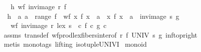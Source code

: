\begin{isabellebody}
\ \ \ h{}{\isacharcolon}{\kern0pt}\ {\isachardoublequoteopen}wf\ {\isacharparenleft}{\kern0pt}inv{\isacharunderscore}{\kern0pt}image\ r\ f{\isacharparenright}{\kern0pt}{\isachardoublequoteclose}\ \isanewline
\ \ h{}{\isacharcolon}{\kern0pt}\ {\isachardoublequoteopen}{\isasymAnd}\ a{\isachardot}{\kern0pt}\ a\ {\isasymin}\ range\ f\ {\isasymLongrightarrow}\ wf\ {\isacharparenleft}{\kern0pt}{\isacharbraceleft}{\kern0pt}x{\isachardot}{\kern0pt}\ f\ x\ {\isacharequal}{\kern0pt}\ a{\isacharbraceright}{\kern0pt}\ {\isasymtimes}\ {\isacharbraceleft}{\kern0pt}x{\isachardot}{\kern0pt}\ f\ x\ {\isacharequal}{\kern0pt}\ a{\isacharbraceright}{\kern0pt}\ {\isasyminter}\ {\isacharparenleft}{\kern0pt}inv{\isacharunderscore}{\kern0pt}image\ s\ g{\isacharparenright}{\kern0pt}{\isacharparenright}{\kern0pt}{\isachardoublequoteclose}\isanewline
\ \ \ {\isachardoublequoteopen}wf\ {\isacharparenleft}{\kern0pt}inv{\isacharunderscore}{\kern0pt}image\ {\isacharparenleft}{\kern0pt}r\ {\isacharless}{\kern0pt}{\isacharasterisk}{\kern0pt}lex{\isacharasterisk}{\kern0pt}{\isachargreater}{\kern0pt}\ s{\isacharparenright}{\kern0pt}\ {\isacharparenleft}{\kern0pt}{\isasymlambda}\ c{\isachardot}{\kern0pt}\ {\isacharparenleft}{\kern0pt}f\ c{\isacharcomma}{\kern0pt}\ g\ c{\isacharparenright}{\kern0pt}{\isacharparenright}{\kern0pt}{\isacharparenright}{\kern0pt}{\isachardoublequoteclose}\isanewline
%
\isadelimproof
\ \ %
\endisadelimproof
%
\isatagproof
{}\isamarkupfalse%
\ assms\ trans{\isacharunderscore}{\kern0pt}def\ wf{\isacharunderscore}{\kern0pt}prod{\isacharunderscore}{\kern0pt}lex{\isacharunderscore}{\kern0pt}fibers{\isacharunderscore}{\kern0pt}inter{\isacharbrackleft}{\kern0pt}of\ r\ f\ UNIV\ s\ g{\isacharbrackright}{\kern0pt}\ inf{\isacharunderscore}{\kern0pt}top{\isacharunderscore}{\kern0pt}right\isanewline
\ \ \isamarkupfalse%
\ {\isacharparenleft}{\kern0pt}metis\ {\isacharparenleft}{\kern0pt}mono{\isacharunderscore}{\kern0pt}tags{\isacharcomma}{\kern0pt}\ lifting{\isacharparenright}{\kern0pt}\ iso{\isacharunderscore}{\kern0pt}tuple{\isacharunderscore}{\kern0pt}UNIV{\isacharunderscore}{\kern0pt}I{\isacharparenright}{\kern0pt}%
\endisatagproof
{\isafoldproof}%
%
\isadelimproof
\isanewline
%
\endisadelimproof
\isanewline
{}\isamarkupfalse%
\ monoid\isanewline
\isanewline
{}%
\isadelimdocument
%
\endisadelimdocument
%
\isatagdocument
%
\isamarkuptrue%
%
\endisatagdocument

\end{isabellebody}
